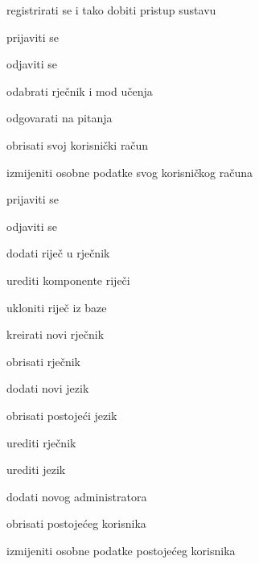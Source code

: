 			
			\begin{packed_enum}
				
				\item  {}
				
				\begin{packed_enum}
					
					\item registrirati se i tako dobiti pristup sustavu
					
				\end{packed_enum}
				
				
				\item  {}
				
				\begin{packed_enum}
					
					\item prijaviti se
					\item odjaviti se
					\item odabrati rječnik i mod učenja
					\item odgovarati na pitanja
					\item obrisati svoj korisnički račun
					\item izmijeniti osobne podatke svog korisničkog računa
					
				\end{packed_enum}
			
				\item  {}
				
				\begin{packed_enum}
					
					\item prijaviti se
					\item odjaviti se
					\item dodati riječ u rječnik
					\item urediti komponente riječi
					\item ukloniti riječ iz baze
					\item kreirati novi rječnik
					\item obrisati rječnik
					\item dodati novi jezik
					\item obrisati postojeći jezik
					\item urediti rječnik
					\item urediti jezik
					\item dodati novog administratora
					\item obrisati postojećeg korisnika
					\item izmijeniti osobne podatke postojećeg korisnika
										

\end{packed_enum}
\end{packed_enum}
